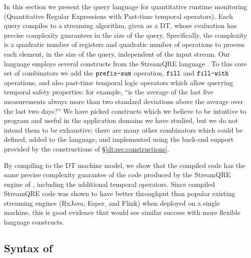 In this section we present the \QREpast{} query language for quantitative runtime monitoring (Quantitative Regular Expressions with Past-time temporal operators). Each query compiles to a streaming algorithm, given as a DT, whose evaluation has precise complexity guarantees in the size of the query. Specifically, the complexity is a quadratic number of registers and quadratic number of operations to process each element, in the size of the query, independent of the input stream. Our language employs several constructs from the StreamQRE language \cite{StreamQRE}. To this core set of combinators we add the $\texttt{prefix-sum}$ operation, $\texttt{fill}$ and $\texttt{fill-with}$ operations, and also past-time temporal logic operators which allow querying temporal safety properties: for example, ``is the average of the last five measurements always more than two standard deviations above the average over the last two days?''
We have picked constructs which we believe to be intuitive to program and useful in the application domains we have studied, but we do not intend them to be exhaustive; there are many other combinators which could be defined, added to the language, and implemented using the back-end support provided by the constructions of \S\ref{dt:sec:constructions}.

By compiling to the DT machine model, we show that the compiled code has the same precise complexity guarantee of the code produced by the StreamQRE engine of \cite{StreamQRE}, including the additional temporal operators. Since compiled StreamQRE code was shown to have better throughput than popular existing streaming engines (RxJava, Esper, and Flink) when deployed on a single machine, this is good evidence that \QREpast{} would see similar success with more flexible language constructs.

\subsection{Syntax of \QREpast}
\label{dt:subsec:rm-syntax}

